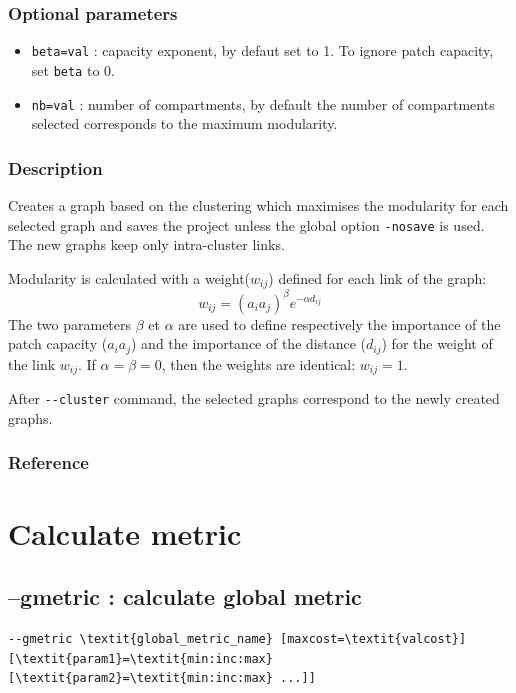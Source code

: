 \documentclass[a4paper,10pt]{report}
\begin{document}
\subsubsection{Optional parameters}
\begin{itemize}
	\item \verb|beta=val| : capacity exponent, by defaut set to 1. To ignore patch capacity, set \verb|beta| to 0.
	\item \verb|nb=val| : number of compartments, by default the number of compartments selected corresponds to the maximum modularity.
\end{itemize}

\subsubsection{Description}
Creates a graph based on the clustering which maximises the modularity \cite{Newman2006} for each selected graph and saves the project unless the global option \verb|-nosave| is used.
The new graphs keep only intra-cluster links.

Modularity is calculated with a weight($w_{ij}$) defined for each link of the graph:
$$w_{ij} = (a_i a_j)^\beta e^{-\alpha d_{ij}}$$
The two parameters $\beta$ et $\alpha$ are used to define respectively the importance of the patch capacity ($a_i a_j$) and the importance of the distance ($d_{ij}$) for the weight of the link $w_{ij}$. If $\alpha = \beta = 0$, then the weights are identical: $w_{ij} = 1$.  

After \verb|--cluster| command, the selected graphs correspond to the newly created graphs.

\subsubsection{Reference}
\cite{2017_clustering}


\section{Calculate metric}

\subsection{--gmetric : calculate global metric}
\begin{Verbatim}[commandchars=\\\{\}]
--gmetric \textit{global_metric_name} [maxcost=\textit{valcost}] [\textit{param1}=\textit{min:inc:max} [\textit{param2}=\textit{min:inc:max} ...]]
\end{Verbatim}
\end{document}
